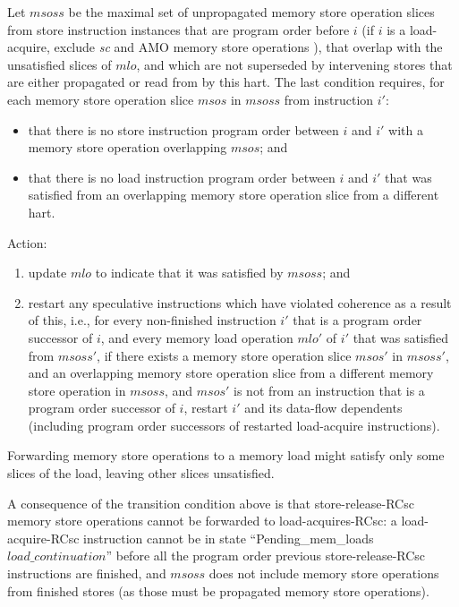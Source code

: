 Let $msoss$ be the maximal set of unpropagated memory store operation slices from store instruction instances that are program order before $i$ (if $i$ is a load-acquire, exclude {\em sc} and AMO memory store operations ), that overlap with the unsatisfied slices of $mlo$, and which are not superseded by intervening stores that are either propagated or read from by this hart.
The last condition requires, for each memory store operation slice $msos$ in $msoss$ from instruction $i'$:
\begin{itemize}
\item that there is no store instruction program order between $i$ and $i'$ with a memory store operation overlapping $msos$; and
\item that there is no load instruction program order between $i$ and $i'$ that was satisfied from an overlapping memory store operation slice from a different hart.
\end{itemize}
Action:
\begin{enumerate}
\item update $mlo$ to indicate that it was satisfied by $msoss$; and
\item restart any speculative instructions which have violated coherence as a result of this, i.e., for every non-finished instruction $i'$ that is a program order successor of $i$, and every memory load operation $mlo'$ of $i'$ that was satisfied from $msoss'$, if there exists a memory store operation slice $msos'$ in $msoss'$, and an overlapping memory store operation slice from a different memory store operation in $msoss$, and $msos'$ is not from an instruction that is a program order successor of $i$, restart $i'$ and its data-flow dependents (including program order successors of restarted load-acquire instructions).
\end{enumerate}

\begin{commentary}
Forwarding memory store operations to a memory load might satisfy only some slices of the load, leaving other slices unsatisfied.

A consequence of the transition condition above is that store-release-RCsc memory store operations cannot be forwarded to load-acquires-RCsc:
a load-acquire-RCsc instruction cannot be in state ``{\sc Pending\_mem\_loads} $load\_continuation$'' before all the program order previous store-release-RCsc instructions are finished, and $msoss$ does not include memory store operations from finished stores (as those must be propagated memory store operations).
\end{commentary}


